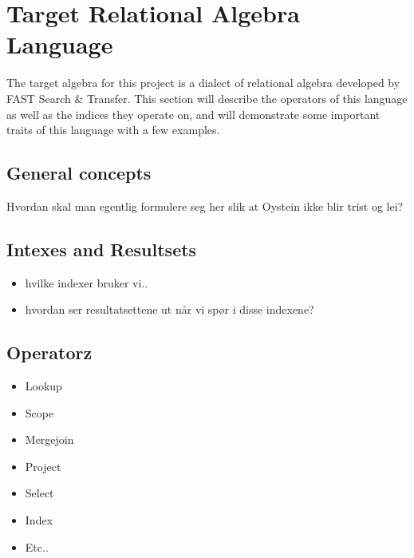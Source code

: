\section{Target Relational Algebra Language}
The target algebra for this project is a dialect of relational algebra
developed by FAST Search \& Transfer. This section will describe the operators
of this language as well as the indices they operate on, and will demonstrate some 
important traits of this language with a few examples.

\subsection{General concepts}
Hvordan skal man egentlig formulere seg her slik at Oystein ikke blir trist og
lei?

\subsection{Intexes and Resultsets}
\begin{itemize}
  \item hvilke indexer bruker vi..
  \item hvordan ser resultatsettene ut n\aa r vi sp\o r i disse indexene?
\end{itemize}


\subsection{Operatorz}
\label{sect:method:marsOperators}

\begin{itemize}
  \item Lookup
  \item Scope
  \item Mergejoin
  \item Project
  \item Select
  \item Index
  \item Etc..
\end{itemize}

